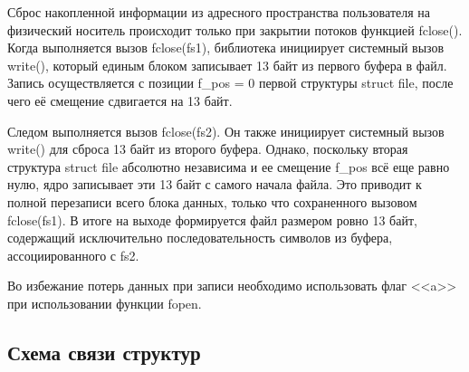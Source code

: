 Сброс накопленной информации из адресного пространства пользователя на физический 
носитель происходит только при закрытии потоков функцией fclose().
Когда выполняется вызов fclose(fs1), библиотека инициирует системный вызов write(), 
который единым блоком записывает 13 байт из первого буфера в файл. Запись 
осуществляется с позиции f\_pos = 0 первой структуры struct file, после чего её 
смещение сдвигается на 13 байт.

Следом выполняется вызов fclose(fs2). Он также инициирует системный вызов write() 
для сброса 13 байт из второго буфера. Однако, поскольку вторая структура struct 
file абсолютно независима и ее смещение f\_pos всё еще равно нулю, ядро записывает 
эти 13 байт с самого начала файла. Это приводит к полной перезаписи всего блока 
данных, только что сохраненного вызовом fclose(fs1). В итоге на выходе формируется 
файл размером ровно 13 байт, содержащий исключительно последовательность символов 
из буфера, ассоциированного с fs2.

Во избежание потерь данных при записи необходимо использовать флаг <<a>>
при использовании функции fopen. 

\subsection{Схема связи структур}
